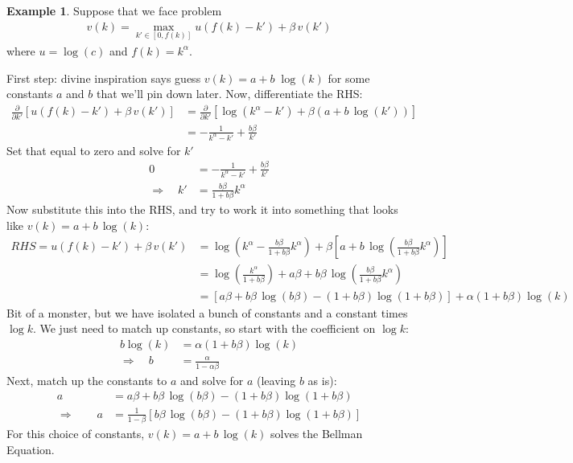 \documentclass[12pt]{book}
\numberwithin{equation}{section} %
\theoremstyle{plain}
\theoremstyle{definition}
\newtheorem{ex}[thm]{Example}
\theoremstyle{remark}
\begin{document}
\begin{ex}
Suppose that we face problem
\begin{align*}
  v(k) = \max_{k'\in[0,f(k)]} u(f(k)-k') + \beta\, v(k')
\end{align*}
where $u=\log(c)$ and $f(k)=k^\alpha$.

First step: divine inspiration says guess $v(k) = a + b \; \log(k)$ for
some constants $a$ and $b$ that we'll pin down later.
Now, differentiate the RHS:
\begin{align*}
  \frac{\partial}{\partial k'}
  \left[
  u(f(k)-k') + \beta\, v(k')
  \right]
  &=
  \frac{\partial}{\partial k'}
  \left[
    \log\left(
    k^\alpha - k'
    \right)
    + \beta (a + b\, \log(k'))
  \right] \\
  &= -\frac{1}{k^\alpha-k'}
  + \frac{b\beta}{k'}
\end{align*}
Set that equal to zero and solve for $k'$
\begin{align*}
  0
  &= -\frac{1}{k^\alpha-k'}
  + \frac{b\beta}{k'}\\
  \Rightarrow\quad
  k' &= \frac{b\beta}{1+b\beta} k^\alpha
\end{align*}
Now substitute this into the RHS, and try to work it into something that
looks like $v(k) = a + b\,\log(k)$:
\begin{align*}
  RHS = u(f(k)-k') + \beta \, v(k')
  &=
  \log\left(
    k^\alpha - \frac{b\beta}{1+b\beta} k^\alpha
  \right)
  + \beta
    \left[
      a + b\,\log\left(\frac{b\beta}{1+b\beta} k^\alpha\right)
    \right] \\
  &=
  \log\left(
    \frac{k^\alpha}{1+b\beta}
  \right)
  + a\beta + b\beta\,\log\left(\frac{b\beta}{1+b\beta} k^\alpha\right) \\
  &=
  [a\beta
  + b\beta\,\log\left(b\beta\right)
  - (1+b\beta)\log\left( 1+b\beta \right)]
  +\alpha(1+b\beta)\log\left( k \right)
\end{align*}
Bit of a monster, but we have isolated a bunch of constants and a
constant times $\log k$. We just need to match up constants, so start
with the coefficient on $\log k$:
\begin{align*}
  b\log(k)
  &= \alpha(1+b\beta) \log(k) \\
  \Rightarrow\quad
  b &= \frac{\alpha}{1-\alpha \beta}
\end{align*}
Next, match up the constants to $a$ and solve for $a$ (leaving $b$ as
is):
\begin{align*}
  a
  &=
  a\beta + b\beta\,\log\left(b\beta\right)
  - (1+b\beta)\log\left( 1+b\beta \right) \\
  \Rightarrow\qquad
  a
  &=
  \frac{1}{1-\beta}
  \left[
    b\beta\,\log\left(b\beta\right)
  - (1+b\beta)\log\left( 1+b\beta \right) \right]
\end{align*}
For this choice of constants, $v(k) = a + b\,\log(k)$ solves the Bellman
Equation.
\end{ex}
\end{document}
